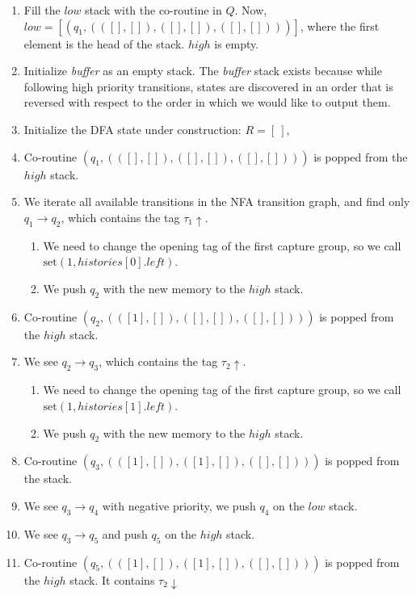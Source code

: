 \documentclass[11pt,a4paper,twoside,openright]{Thesis}
\theoremstyle{definition}
\begin{document}
\begin{example}
\begin{enumerate}
\item Fill the $low$ stack with the co-routine in $Q$.
  Now, $\mathit{low}=[(q_1, (([], []), ([], []), ([], [])))]$, where the
  first element is the head of the stack. $high$ is empty.
\item Initialize \emph{buffer} as an empty stack.
  The \emph{buffer} stack exists because while following high priority
  transitions, states are discovered in an order that is reversed with respect
  to the order in which we would like to output them.
\item Initialize the DFA state under construction: $R=[\ ]$, 
\item Co-routine $(q_1,(([], []), ([], []), ([], [])))$ is popped from the
  $high$ stack.
\item We iterate all available transitions in the NFA transition graph, and
  find only $q_1\rightarrow q_2$, which contains the tag $\tau_1\uparrow$.
  \begin{enumerate}
    \item We need to change the opening tag of the first capture group, so we 
      call $\mbox{set}(1, histories[0].left)$.
    \item We push $q_2$ with the new memory to the $high$ stack.
  \end{enumerate}
\item Co-routine $(q_2,(([1], []), ([], []), ([], [])))$ is popped from the
  $high$ stack.
\item We see $q_2\rightarrow q_3$, which contains the tag $\tau_2\uparrow$.
  \begin{enumerate}
    \item We need to change the opening tag of the first capture group, so we 
      call $\mbox{set}(1, histories[1].left)$.
    \item We push $q_2$ with the new memory to the $high$ stack.
  \end{enumerate}
\item Co-routine $(q_3,(([1], []), ([1], []), ([], [])))$ is popped from the
  stack.
\item We see $q_3\rightarrow q_4$ with negative priority, we push $q_4$ on 
  the $low$ stack.
\item We see $q_3\rightarrow q_5$ and push $q_5$ on the $high$ stack.
\item Co-routine $(q_5,(([1], []), ([1], []), ([], [])))$ is popped from the
  $high$ stack. It contains $\tau_2\downarrow$
  \begin{enumerate}

\end{enumerate}
\end{enumerate}
\end{example}
\end{document}
